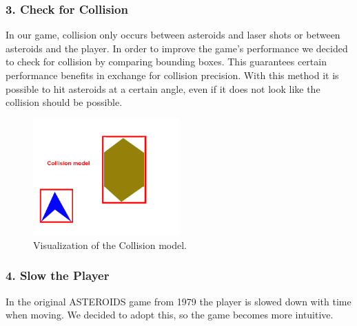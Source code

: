 \documentclass{report}
\begin{document}
\subsubsection{3. Check for Collision}
In our game, collision only occurs between asteroids and laser shots or between asteroids and the player. In order to improve the game's performance we decided to check for collision by comparing bounding boxes. This guarantees certain performance benefits in exchange for collision precision. With this method it is possible to hit asteroids at a certain angle, even if it does not look like the collision should be possible.
\begin{figure}[h]
	\centering
	\includegraphics[width=0.5\textwidth]{Collision.png}
	\caption{Visualization of the Collision model.}
	\label{img:collision}
\end{figure}
\subsubsection{4. Slow the Player}
In the original ASTEROIDS game from 1979 the player is slowed down with time when moving. We decided to adopt this, so the game becomes more intuitive.
\end{document}
